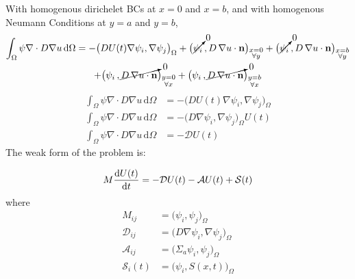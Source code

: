 \documentclass[a4paper]{article}
\begin{document}
    With homogenous dirichelet BCs at $x=0$ and $x=b$, and with homogenous Neumann Conditions at $y=a$ and $y=b$,
    \begin{multline}
        \int_\Omega \psi \nabla \cdot D \nabla u\, \mathrm{d}\Omega = - \big(D U(t) \nabla \psi_i, \nabla \psi_j \big)_\Omega  +  \big(\cancelto{0}{\psi_i} \,, D \, \nabla u\cdot \mathbf{n}\big)_{\substack{x=0\\\forall y}} +  \big(\cancelto{0}{\psi_i} \,, D \, \nabla u\cdot \mathbf{n}\big)_{\substack{x=b\\\forall y}} \\ +  \big(\psi_i \,, \cancelto{0}{D \, \nabla u\cdot \mathbf{n}}\big)_{\substack{y=0\\\forall x}} +  \big(\psi_i \,,\cancelto{0}{D \, \nabla u\cdot \mathbf{n}}\big)_{\substack{y=b\\\forall x}}
    \end{multline}
    \begin{align}
        \int_\Omega \psi \nabla \cdot D \nabla u\, \mathrm{d}\Omega &= - \big(D U(t) \nabla \psi_i, \nabla \psi_j \big)_\Omega \label{eq:weak_form_diffusion_laplacian_2d_after_homogenous_bcs}\\
        \int_\Omega \psi \nabla \cdot D \nabla u\, \mathrm{d}\Omega &= - \big( D \nabla \psi_i, \nabla \psi_j \big)_\Omega U(t) \\
        \int_\Omega \psi \nabla \cdot D \nabla u\, \mathrm{d}\Omega &= - \mathcal{D} U(t) 
    \end{align}
    The weak form of the problem  is:

    \begin{equation}
        M \diff{U(t)}{t} = -\mathcal{D} U(t) - \mathcal{A} U(t) + \mathcal{S}(t)
    \end{equation}
    where
    \begin{align}
        M_{ij} &= \big(\psi_i,\psi_j)_\Omega \\
        \mathcal{D}_{ij} &= \big(D \nabla \psi_i,\nabla \psi_j)_\Omega \\
        \mathcal{A}_{ij} &= \big(\Sigma_a \psi_i,\psi_j)_\Omega \\
            \mathcal{S}_{i}(t) &= \big(\psi_i,S(x,t))_\Omega
    \end{align}
\end{document}
